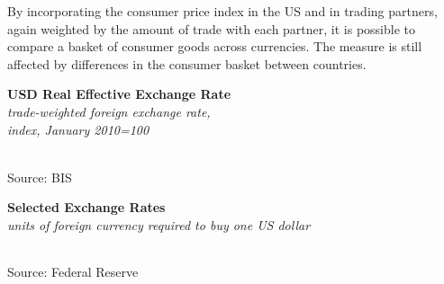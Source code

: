 \documentclass{report}
\makeatletter
\newcommand{\tbllink}[1]{\href{https://raw.githubusercontent.com/bdecon/US-chartbook/master/chartbook/data/#1}{\faTable}}
\newcommand*\short[1]{\expandafter\@gobbletwo\number\numexpr#1\relax}
\newcommand{\absnode}[3]{\node[below right, align=left] at (axis cs: #1,#2) {#3};}
\newcommand{\shdateaxisticks}{
		date coordinates in=x, axis line style={draw=none},
		xmax={2022-03-15},
		max space between ticks=40,	    
		xtick={{1990-01-01}, {1995-01-01}, {2000-01-01}, 
			{2005-01-01}, {2010-01-01}, {2015-01-01}, {2020-01-01}},
		minor xtick={},
		enlarge y limits={0.06}, enlarge x limits={0.01},
		}
\newcommand{\bbar}[2]{extra #1 ticks = {{#2}}, extra #1 tick labels = ,
		extra #1 tick style = {grid=major, grid style={thick, black!25}},}
\newcommand{\stdline}[4]{\addplot[very thick, no markers, color=#1] 
		table [x=#2, y=#3, col sep=comma] {#4};	}
\newcommand{\rebars}{
		\fill[color=black!10] (axis cs:{2007-12-01},\pgfkeysvalueof{/pgfplots/ymin}) rectangle 
			(axis cs:{2009-07-01}, \pgfkeysvalueof{/pgfplots/ymax});
		\fill[color=black!10] (axis cs:{2001-03-01},\pgfkeysvalueof{/pgfplots/ymin}) rectangle 
			(axis cs:{2001-11-01}, \pgfkeysvalueof{/pgfplots/ymax});
		\fill[color=black!10] (axis cs:{2020-02-01},\pgfkeysvalueof{/pgfplots/ymin}) rectangle 
			(axis cs:{2020-05-01}, \pgfkeysvalueof{/pgfplots/ymax});}
\makeatother
\begin{document}
{\begin{minipage}{0.76\textwidth}
By incorporating the consumer price index in the US and in trading partners, again weighted by the amount of trade with each partner, it is possible to compare a basket of consumer goods across currencies. The measure is still affected by differences in the consumer basket between countries.  
\vspace{0.5mm}

\begin{minipage}{0.58\textwidth}
\normalsize \textbf{USD Real Effective Exchange Rate}\\
\footnotesize{\textit{trade-weighted foreign exchange rate,}}\\
\footnotesize{\textit{index, January 2010=100}}\\
\hspace*{-2mm} \\
\footnotesize{Source: BIS} \hfill \tbllink{reer.csv}
\end{minipage}\hfill
\begin{minipage}{0.33\textwidth}
\small 
\end{minipage}
\vspace{4mm}

\normalsize \textbf{Selected Exchange Rates}\\
\footnotesize{\textit{units of foreign currency required to buy one US dollar}}\\
 \setlength{\tabcolsep}{1.0pt} \color{black!90}
	{\renewcommand{\arraystretch}{1.52}
		\begin{tabular}{p{12mm} R{14.5mm} R{14.5mm} R{14.5mm} R{14.5mm} R{14.0mm} 
		 				 R{14.0mm} R{14.0mm}}
			  \hline
		\end{tabular}}\vspace{-2mm}
		
\footnotesize{Source: Federal Reserve}
\end{minipage}
\newpage
\hypertarget{lab}{}
\begin{minipage}{0.34\textwidth}

\end{minipage}}
\end{document}
